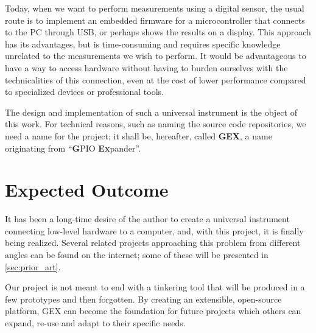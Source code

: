 Today, when we want to perform measurements using a digital sensor, the usual route is to implement an embedded firmware for a microcontroller that connects to the \gls{PC} through \gls{USB}, or perhaps shows the results on a display. This approach has its advantages, but is time-consuming and requires specific knowledge unrelated to the measurements we wish to perform. It would be advantageous to have a way to access hardware without having to burden ourselves with the technicalities of this connection, even at the cost of lower performance compared to specialized devices or professional tools.

The design and implementation of such a universal instrument is the object of this work. For technical reasons, such as naming the source code repositories, we need a name for the project; it shall be, hereafter, called \textbf{GEX}, a name originating from ``\textbf{G}PIO \textbf{Ex}pander''.

\section{Expected Outcome}\label{sec:expected_outcome}

It has been a long-time desire of the author to create a universal instrument connecting low-level hardware to a computer, and, with this project, it is finally being realized. Several related projects approaching this problem from different angles can be found on the internet; some of these will be presented in \cref{sec:prior_art}. 

Our project is not meant to end with a tinkering tool that will be produced in a few prototypes and then forgotten. By creating an extensible, open-source platform, GEX can become the foundation for future projects which others can expand, re-use and adapt to their specific needs.

